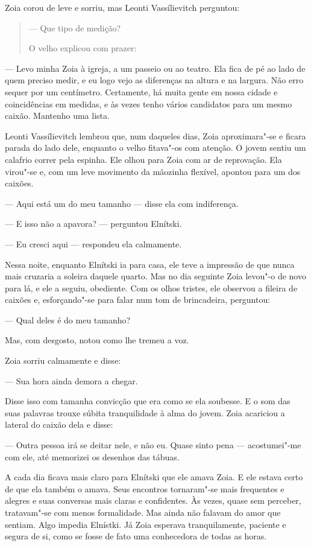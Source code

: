 Zoia corou de leve e sorriu, mas Leonti Vassílievitch perguntou:

\begin{quote}
--- Que tipo de medição?

O velho explicou com prazer:
\end{quote}

--- Levo minha Zoia à igreja, a um passeio ou ao teatro. Ela fica de pé
ao lado de quem preciso medir, e eu logo vejo as diferenças na altura e
na largura. Não erro sequer por um centímetro. Certamente, há muita
gente em nossa cidade e coincidências em medidas, e às vezes tenho
vários candidatos para um mesmo caixão. Mantenho uma lista.

Leonti Vassílievitch lembrou que, num daqueles dias, Zoia aproximara"-se
e ficara parada do lado dele, enquanto o velho fitava"-os com atenção. O
jovem sentiu um calafrio correr pela espinha. Ele olhou para Zoia com ar
de reprovação. Ela virou"-se e, com um leve movimento da mãozinha
flexível, apontou para um dos caixões.

--- Aqui está um do meu tamanho --- disse ela com indiferença.

--- E isso não a apavora? --- perguntou Elnítski.

--- Eu cresci aqui --- respondeu ela calmamente.

Nessa noite, enquanto Elnítski ia para casa, ele teve a impressão de que
nunca mais cruzaria a soleira daquele quarto. Mas no dia seguinte Zoia
levou"-o de novo para lá, e ele a seguiu, obediente. Com os olhos
tristes, ele observou a fileira de caixões e, esforçando"-se para falar
num tom de brincadeira, perguntou:

--- Qual deles é do meu tamanho?

Mas, com desgosto, notou como lhe tremeu a voz.

Zoia sorriu calmamente e disse:

--- Sua hora ainda demora a chegar.

Disse isso com tamanha convicção que era como se ela soubesse. E o som
das suas palavras trouxe súbita tranquilidade à alma do jovem. Zoia
acariciou a lateral do caixão dela e disse:

--- Outra pessoa irá se deitar nele, e não eu. Quase sinto pena ---
acostumei"-me com ele, até memorizei os desenhos das tábuas.

A cada dia ficava mais claro para Elnítski que ele amava Zoia. E ele
estava certo de que ela também o amava. Seus encontros tornaram"-se mais
frequentes e alegres e suas conversas mais claras e confidentes. Às
vezes, quase sem perceber, tratavam"-se com menos formalidade. Mas ainda
não falavam do amor que sentiam. Algo impedia Elnístki. Já Zoia esperava
tranquilamente, paciente e segura de si, como se fosse de fato uma
conhecedora de todas as horas.

